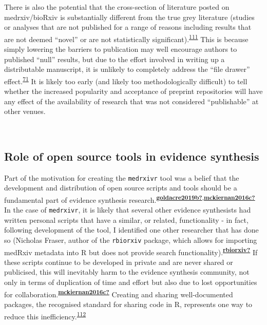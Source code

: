 \documentclass[a4paper, twoside]{templates/ociamthesis}
\begin{document}
There is also the potential that the cross-section of literature posted on medrxiv/bioRxiv is substantially different from the true grey literature (studies or analyses that are not published for a range of reasons including results that are not deemed ``novel'' or are not statistically significant).\textsuperscript{\protect\hyperlink{ref-song2010}{111}} This is because simply lowering the barriers to publication may well encourage authors to published ``null'' results, but due to the effort involved in writing up a distributable manuscript, it is unlikely to completely address the ``file drawer'' effect.\textsuperscript{\protect\hyperlink{ref-rosenthal1979}{71}} It is likely too early (and likely too methodologically difficult) to tell whether the increased popularity and acceptance of preprint repositories will have any effect of the availability of research that was not considered ``publishable'' at other venues.

~

\hypertarget{role-of-open-source-tools-in-evidence-synthesis}{%
\subsection{Role of open source tools in evidence synthesis}\label{role-of-open-source-tools-in-evidence-synthesis}}

Part of the motivation for creating the \texttt{medrxivr} tool was a belief that the development and distribution of open source scripts and tools should be a fundamental part of evidence synthesis research.\textsuperscript{\protect\hyperlink{ref-goldacre2019b}{\textbf{goldacre2019b?}},\protect\hyperlink{ref-mckiernan2016c}{\textbf{mckiernan2016c?}}} In the case of \texttt{medrxivr}, it is likely that several other evidence synthesists had written personal scripts that have a similar, or related, functionality - in fact, following development of the tool, I identified one other researcher that has done so (Nicholas Fraser, author of the \texttt{rbiorxiv} package, which allows for importing medRxiv metadata into R but does not provide search functionality).\textsuperscript{\protect\hyperlink{ref-rbiorxiv}{\textbf{rbiorxiv?}}} If these scripts continue to be developed in private and are never shared or publicised, this will inevitably harm to the evidence synthesis community, not only in terms of duplication of time and effort but also due to lost opportunities for collaboration.\textsuperscript{\protect\hyperlink{ref-mckiernan2016c}{\textbf{mckiernan2016c?}}} Creating and sharing well-documented packages, the recognised standard for sharing code in R, represents one way to reduce this inefficiency.\textsuperscript{\protect\hyperlink{ref-vuorre2020}{112}}
\end{document}
